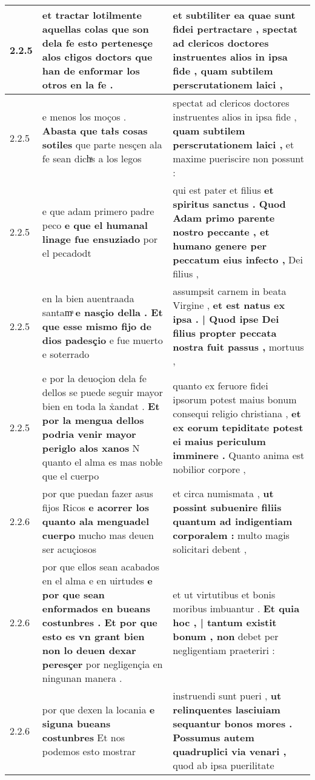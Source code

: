 \begin{tabular}{|p{1cm}|p{6.5cm}|p{6.5cm}|}
2.2.5 & et tractar lotilmente aquellas colas \textbf{ que son dela fe esto pertenesçe alos cłigos doctors } que han de enformar los otros en la fe . & et subtiliter ea quae sunt fidei pertractare , \textbf{ spectat ad clericos doctores instruentes alios in ipsa fide , } quam subtilem perscrutationem laici , \\\hline
2.2.5 & e menos los moços . \textbf{ Abasta que tałs cosas sotiles } que parte nesçen ala fe sean dichͣs a los legos & spectat ad clericos doctores instruentes alios in ipsa fide , \textbf{ quam subtilem perscrutationem laici , } et maxime pueriscire non possunt : \\\hline
2.2.5 & e que adam primero padre peco \textbf{ e que el humanal linage fue ensuziado } por el pecadodt & qui est pater et filius \textbf{ et spiritus sanctus . Quod Adam primo parente nostro peccante , et humano genere per peccatum eius infecto , } Dei filius , \\\hline
2.2.5 & en la bien auentraada santamͣ \textbf{ e nasçio della . Et que esse mismo fijo de dios padesçio } e fue muerto e soterrado & assumpsit carnem in beata Virgine , \textbf{ et est natus ex ipsa . | Quod ipse Dei filius propter peccata nostra fuit passus , } mortuus , \\\hline
2.2.5 & e por la deuoçion dela fe dellos se puede seguir mayor bien en toda la x̉andat . \textbf{ Et por la mengua dellos podria venir mayor periglo alos xanos } N quanto el alma es mas noble que el cuerpo & quanto ex feruore fidei ipsorum potest maius bonum consequi religio christiana , \textbf{ et ex eorum tepiditate potest ei maius periculum imminere . } Quanto anima est nobilior corpore , \\\hline
2.2.6 & por que puedan fazer asus fijos Ricos \textbf{ e acorrer los quanto ala menguadel cuerpo } mucho mas deuen ser acuçiosos & et circa numismata , \textbf{ ut possint subuenire filiis quantum ad indigentiam corporalem : } multo magis solicitari debent , \\\hline
2.2.6 & por que ellos sean acabados en el alma e en uirtudes \textbf{ e por que sean enformados en bueans costunbres . Et por que esto es vn grant bien non lo deuen dexar peresçer } por negligençia en ningunan manera . & et ut virtutibus et bonis moribus imbuantur . \textbf{ Et quia hoc , | tantum existit bonum , non } debet per negligentiam praeteriri : \\\hline
2.2.6 & por que dexen la locania \textbf{ e siguna bueans costunbres } Et nos podemos esto mostrar & instruendi sunt pueri , \textbf{ ut relinquentes lasciuiam sequantur bonos mores . Possumus autem quadruplici via venari , } quod ab ipsa puerilitate \\\hline

\end{tabular}
